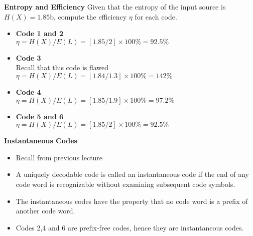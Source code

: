 \documentclass[a4]{beamer}
\begin{document}
\medskip
\noindent \textbf{Entropy and Efficiency}
Given that the entropy of the input source is $H(X) = 1.85$b, compute the efficiency $\eta$ for each code.
\begin{itemize}
\item \textbf{Code 1 and 2} \\$ \eta = H(X) / E(L) = [1.85 / 2] \times 100\% = 92.5\% $
\item \textbf{Code 3} \\Recall that this code is flawed $ \eta = H(X) / E(L) = [1.84 / 1.3] \times 100\% = 142\% $
\item \textbf{Code 4}\\ $ \eta = H(X) / E(L) = [1.85 / 1.9] \times 100\% = 97.2\% $
\item \textbf{Code 5 and 6}\\ $ \eta = H(X) / E(L) = [1.85 / 2] \times 100\% = 92.5\% $

\end{itemize}



\medskip
\noindent \textbf{Instantaneous Codes}
\begin{itemize} \item Recall from previous lecture \item A uniquely decodable code is called an instantaneous code if the end of any code word is
recognizable without examining subsequent code symbols. \item The instantaneous codes have the property
that no code word is a prefix of another code word.  \item Codes 2,4 and 6 are prefix-free codes, hence they are instantaneous codes.\end{itemize}






\end{document}
